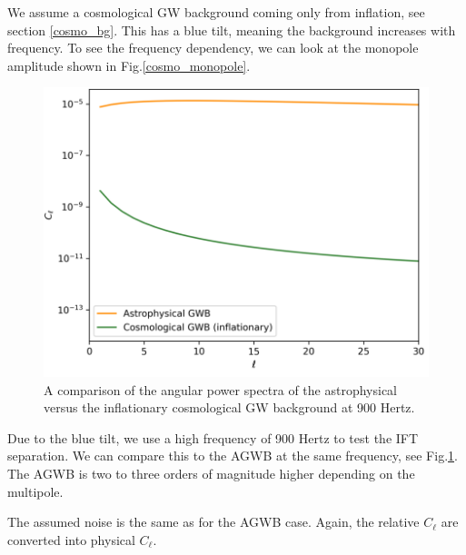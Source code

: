 We assume a cosmological GW background coming only from inflation, see section \ref{cosmo_bg}. This has a blue tilt, meaning the background increases with frequency. To see the frequency dependency, we can look at the monopole amplitude shown in Fig.\ref{cosmo_monopole}.



\begin{figure}[h]
    \centering
    \includegraphics[width=0.6\linewidth]{Images/astro_vs_cosmo.png}
    \caption{A comparison of the angular power spectra of the astrophysical versus the inflationary cosmological GW background at 900 Hertz.}
    \label{astro_cosmo}
\end{figure} 

Due to the blue tilt, we use a high frequency of 900 Hertz to test the IFT separation.
We can compare this to the AGWB at the same frequency, see Fig.\ref{astro_cosmo}. The AGWB is two to three orders of magnitude higher depending on the multipole. 


The assumed noise is the same as for the AGWB case. Again, the relative $C_\ell$ are converted into physical $C_\ell$.

